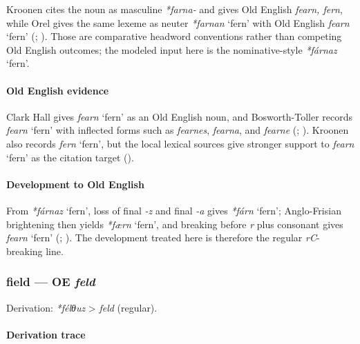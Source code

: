 \documentclass[
  british,
  a4paper,
]{article}
\providecommand{\Recon}[1]{\emph{*#1}}
\begin{document}
Kroonen cites the noun as masculine \emph{*farna-} and gives Old English
\emph{fearn, fern}, while Orel gives the same lexeme as neuter
\Recon{farnan} `fern' with Old English {\emph{fearn}} `fern'
(; ). Those are comparative headword conventions rather than
competing Old English outcomes; the modeled input here is the
nominative-style \Recon{fárnaz} `fern'.

\paragraph{Old English evidence}\label{old-english-evidence-19}

Clark Hall gives {\emph{fearn}} `fern' as an Old English noun, and
Bosworth-Toller records {\emph{fearn}} `fern' with inflected forms such
as \emph{fearnes}, \emph{fearna}, and \emph{fearne}
(;
).
Kroonen also records {\emph{fern}} `fern', but the local lexical sources
give stronger support to {\emph{fearn}} `fern' as the citation target
().

\paragraph{Development to Old
English}\label{development-to-old-english-19}

From \Recon{fárnaz} `fern', loss of final \emph{-z} and final \emph{-a}
gives \Recon{fárn} `fern'; Anglo-Frisian brightening then yields
\Recon{færn} `fern', and breaking before \emph{r} plus consonant gives
{\emph{fearn}} `fern' (;
). The development
treated here is therefore the regular \emph{rC}-breaking line.

\subsubsection{\texorpdfstring{field --- OE
\emph{feld}}{field --- OE feld}}\label{field-oe-feld}

Derivation: \emph{*félθuz} \textgreater{} \emph{feld} (regular).

\paragraph{Derivation trace}\label{derivation-trace-23}
\end{document}
